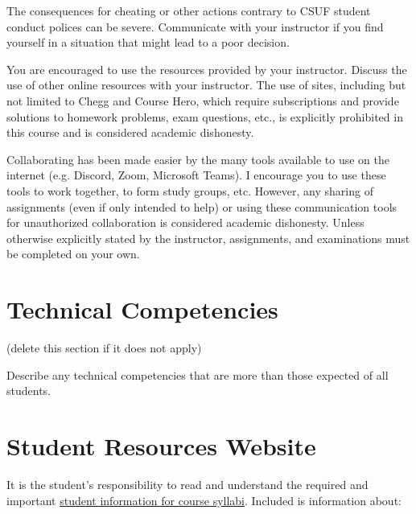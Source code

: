 \documentclass[12pt]{article}
\begin{document}
{\color{suggestionred}The consequences for cheating or other actions contrary to CSUF student conduct polices can be severe. Communicate with your instructor if you find yourself in a situation that might lead to a poor decision.}

{\color{suggestionred}You are encouraged to use the resources provided by your instructor. Discuss the use of other online resources with your instructor. The use of sites, including but not limited to Chegg and Course Hero, which require subscriptions and provide solutions to homework problems, exam questions, etc., is explicitly prohibited in this course and is considered academic dishonesty.}

{\color{suggestionred}Collaborating has been made easier by the many tools available to use on the internet (e.g. Discord, Zoom, Microsoft Teams). I encourage you to use these tools to work together, to form study groups, etc. However, any sharing of assignments (even if only intended to help) or using these communication tools for unauthorized collaboration is considered academic dishonesty. Unless otherwise explicitly stated by the instructor, assignments, and examinations must be completed on your own.}

\section{Technical Competencies} {\color{annotationblue}(delete this section if it does not apply)}

{\color{annotationblue}Describe any technical competencies that are more than those expected of all students.}

\section{Student Resources Website}

It is the student's responsibility to read and understand the required and important \href{https://fdc.fullerton.edu/teaching/student-info-syllabi.html}{student information for course syllabi}. Included is information about:
\end{document}
